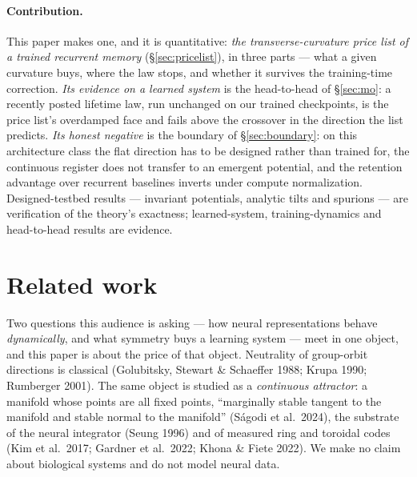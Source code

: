 \documentclass{article}
\begin{document}
\paragraph{Contribution.} This paper makes one, and it is quantitative: \emph{the transverse-curvature price list of a trained recurrent memory} (\S\ref{sec:pricelist}), in three parts --- what a given curvature buys, where the law stops, and whether it survives the training-time correction. \emph{Its evidence on a learned system} is the head-to-head of \S\ref{sec:mo}: a recently posted lifetime law, run unchanged on our trained checkpoints, is the price list's overdamped face and fails above the crossover in the direction the list predicts. \emph{Its honest negative} is the boundary of \S\ref{sec:boundary}: on this architecture class the flat direction has to be designed rather than trained for, the continuous register does not transfer to an emergent potential, and the retention advantage over recurrent baselines inverts under compute normalization. Designed-testbed results --- invariant potentials, analytic tilts and spurions --- are verification of the theory's exactness; learned-system, training-dynamics and head-to-head results are evidence.

\section{Related work}\label{sec:related}

Two questions this audience is asking --- how neural representations behave \emph{dynamically}, and what symmetry buys a learning system --- meet in one object, and this paper is about the price of that object. Neutrality of group-orbit directions is classical (Golubitsky, Stewart \& Schaeffer 1988; Krupa 1990; Rumberger 2001). The same object is studied as a \emph{continuous attractor}: a manifold whose points are all fixed points, ``marginally stable tangent to the manifold and stable normal to the manifold'' (S\'agodi et al.\ 2024), the substrate of the neural integrator (Seung 1996) and of measured ring and toroidal codes (Kim et al.\ 2017; Gardner et al.\ 2022; Khona \& Fiete 2022). We make no claim about biological systems and do not model neural data.
\end{document}
